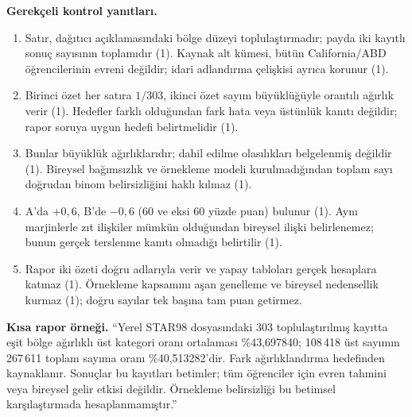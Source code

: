 \textbf{Gerekçeli kontrol yanıtları.}
\begin{enumerate}
\item Satır, dağıtıcı açıklamasındaki bölge düzeyi toplulaştırmadır;
  payda iki kayıtlı sonuç sayısının toplamıdır (1). Kaynak alt kümesi,
  bütün California/ABD öğrencilerinin evreni değildir; idari adlandırma
  çelişkisi ayrıca korunur (1).
\item Birinci özet her satıra $1/303$, ikinci özet sayım büyüklüğüyle
  orantılı ağırlık verir (1). Hedefler farklı olduğundan fark hata veya
  üstünlük kanıtı değildir; rapor soruya uygun hedefi belirtmelidir (1).
\item Bunlar büyüklük ağırlıklarıdır; dahil edilme olasılıkları
  belgelenmiş değildir (1). Bireysel bağımsızlık ve örnekleme modeli
  kurulmadığından toplam sayı doğrudan binom belirsizliğini haklı kılmaz (1).
\item A'da $+0{,}6$, B'de $-0{,}6$ (60 ve eksi 60 yüzde puan) bulunur (1).
  Aynı marjinlerle zıt ilişkiler mümkün olduğundan bireysel ilişki
  belirlenemez; bunun gerçek terslenme kanıtı olmadığı belirtilir (1).
\item Rapor iki özeti doğru adlarıyla verir ve yapay tabloları gerçek
  hesaplara katmaz (1). Örnekleme kapsamını aşan genelleme ve bireysel
  nedensellik kurmaz (1); doğru sayılar tek başına tam puan getirmez.
\end{enumerate}

\textbf{Kısa rapor örneği.} ``Yerel STAR98 dosyasındaki 303 toplulaştırılmış
kayıtta eşit bölge ağırlıklı üst kategori oranı ortalaması \%43,697840;
108\,418 üst sayımın 267\,611 toplam sayıma oranı \%40,513282'dir.
Fark ağırlıklandırma hedefinden kaynaklanır. Sonuçlar bu kayıtları betimler;
tüm öğrenciler için evren tahmini veya bireysel gelir etkisi değildir.
Örnekleme belirsizliği bu betimsel karşılaştırmada hesaplanmamıştır.''